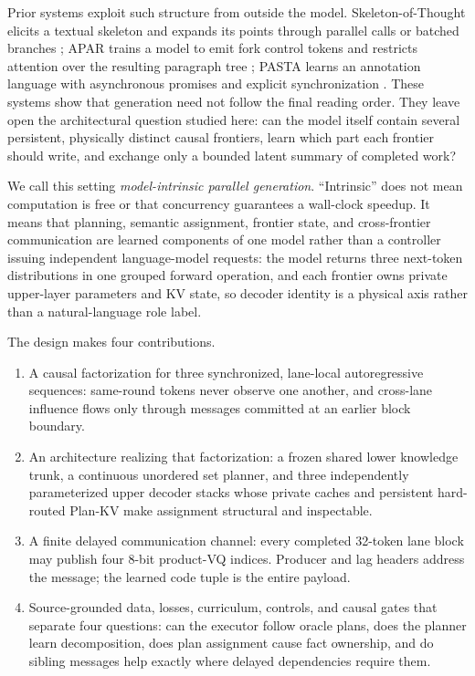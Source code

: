\documentclass[10pt]{article}
\begin{document}
Prior systems exploit such structure from outside the model.
Skeleton-of-Thought elicits a textual skeleton and expands its points through
parallel calls or batched branches \citep{ning2024sot}; APAR trains a model to
emit fork control tokens and restricts attention over the resulting paragraph
tree \citep{liu2024apar}; PASTA learns an annotation language with
asynchronous promises and explicit synchronization \citep{jin2025promise}.
These systems show that generation need not follow the final reading order.
They leave open the architectural question studied here: can the model itself
contain several persistent, physically distinct causal frontiers, learn which
part each frontier should write, and exchange only a bounded latent summary of
completed work?

We call this setting \emph{model-intrinsic parallel generation}. ``Intrinsic''
does not mean computation is free or that concurrency guarantees a wall-clock
speedup. It means that planning, semantic assignment, frontier state, and
cross-frontier communication are learned components of one model rather than a
controller issuing independent language-model requests: the model returns
three next-token distributions in one grouped forward operation, and each
frontier owns private upper-layer parameters and KV state, so decoder identity
is a physical axis rather than a natural-language role label.

The design makes four contributions.

\begin{enumerate}[leftmargin=*,itemsep=0.25em]
    \item A causal factorization for three synchronized, lane-local
    autoregressive sequences: same-round tokens never observe one another, and
    cross-lane influence flows only through messages committed at an earlier
    block boundary.

    \item An architecture realizing that factorization: a frozen shared lower
    knowledge trunk, a continuous unordered set planner, and three
    independently parameterized upper decoder stacks whose private caches and
    persistent hard-routed Plan-KV make assignment structural and
    inspectable.

    \item A finite delayed communication channel: every completed 32-token
    lane block may publish four 8-bit product-VQ indices. Producer and lag
    headers address the message; the learned code tuple is the entire
    payload.

    \item Source-grounded data, losses, curriculum, controls, and causal
    gates that separate four questions: can the executor follow oracle plans,
    does the planner learn decomposition, does plan assignment cause fact
    ownership, and do sibling messages help exactly where delayed
    dependencies require them.
\end{enumerate}
\end{document}
